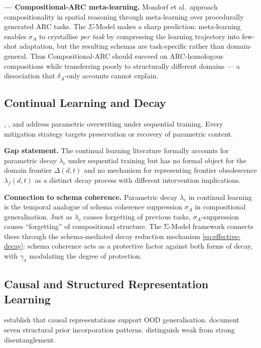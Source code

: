 \documentclass[10pt]{article}
\begin{document}
\textbf{\cite{mondorf2026compositionalarc} --- Compositional-ARC meta-learning.}
Mondorf et al.~approach compositionality in spatial reasoning through meta-learning
over procedurally generated ARC tasks. The $\Sigma$-Model makes a sharp prediction:
meta-learning enables $\sigma_A$ to crystallise \emph{per task} by compressing the
learning trajectory into few-shot adaptation, but the resulting schemas are
task-specific rather than domain-general. Thus Compositional-ARC should succeed on
ARC-homologous compositions while transferring poorly to structurally different
domains --- a dissociation that $\delta_A$-only accounts cannot explain.

\subsection{Continual Learning and Decay}\label{sec:continual-learning}

\cite{mccloskey1989catastrophicinterference},
\cite{goodfellow2013empiricalinvestigationcatastrophicforgetting}, and
\cite{kirkpatrick2017overcomingcatastrophicforgetting} address parametric
overwriting under sequential training. Every mitigation strategy targets
preservation or recovery of parametric content.

\textbf{Gap statement.} The continual learning literature formally
accounts for parametric decay $\lambda_c$ under sequential training but
has no formal object for the domain frontier $\Delta(d,t)$ and no
mechanism for representing frontier obsolescence $\lambda_f(d,t)$ as a
distinct decay process with different intervention implications.

\textbf{Connection to schema coherence.} Parametric decay $\lambda_c$ in
continual learning is the temporal analogue of schema coherence suppression
$\sigma_A$ in compositional generalisation. Just as $\lambda_c$ causes
forgetting of previous tasks, $\sigma_A$-suppression causes ``forgetting''
of compositional structure. The Σ-Model framework connects these through the
schema-mediated decay reduction mechanism \eqref{eq:effective-decay}:
schema coherence acts as a protective factor against both forms of decay,
with $\gamma_\sigma$ modulating the degree of protection.

\subsection{Causal and Structured Representation Learning}\label{sec:causal-repr}

\cite{scholkopf2021towardcausalrepresentationlearning} establish that
causal representations support OOD generalisation.
\cite{mohan2024structureindrlsurveyopenproblems} document seven structural
prior incorporation patterns. \cite{torresan2024disentangledrepresentationscausalcognition}
distinguish weak from strong disentanglement.
\end{document}
